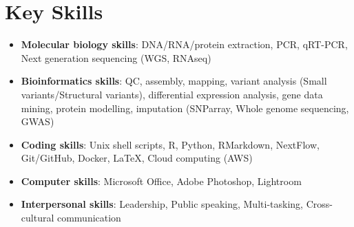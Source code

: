 \documentclass[letterpaper,11pt]{article}
\newcommand{\resumeItem}[2]{
  \item\small{
    \textbf{#1}{: #2 \vspace{0pt}}
  }
}
\newcommand{\resumeRef}[2]{
  \item\small{
    \textbf{#1} {#2}}
  }
\newcommand{\resumeSubItem}[2]{\resumeItem{#1}{#2}}
\newcommand{\resumeItemListStart}{\begin{itemize}}
\newcommand{\resumeItemListEnd}{\end{itemize}}
\begin{document}
\section{Key Skills}
 \resumeItemListStart
    \resumeSubItem{Molecular biology skills}{DNA/RNA/protein extraction, PCR, qRT-PCR, Next generation sequencing (WGS, RNAseq)}
    \resumeSubItem{Bioinformatics skills}{QC, assembly, mapping, variant analysis (Small variants/Structural variants), differential expression analysis, gene data mining, protein modelling, imputation (SNParray, Whole genome sequencing, GWAS)}
    \resumeSubItem{Coding skills}{Unix shell scripts, R, Python, RMarkdown, NextFlow, Git/GitHub, Docker, LaTeX, Cloud computing (AWS)}
    \resumeSubItem{Computer skills}{Microsoft Office, Adobe Photoshop, Lightroom}
    \resumeSubItem{Interpersonal skills}{Leadership, Public speaking, Multi-tasking, Cross-cultural communication}
  \resumeItemListEnd

  
\end{document}

